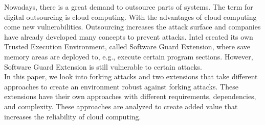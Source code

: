 Nowadays, there is a great demand to outsource parts of systems. The term for digital outsourcing is cloud computing. With the advantages of cloud computing come new vulnerabilities. Outsourcing increases the attack surface and companies have already developed many concepts to prevent attacks. Intel created its own Trusted Execution Environment, called Software Guard Extension, where save memory areas are deployed to, e.g., execute certain program sections. However, Software Guard Extension is still vulnerable to certain attacks.\\
In this paper, we look into forking attacks and two extensions that take different approaches to create an environment robust against forking attacks. These extensions have their own approaches with different requirements, dependencies, and complexity. These approaches are analyzed to create added value that increases the reliability of cloud computing.
